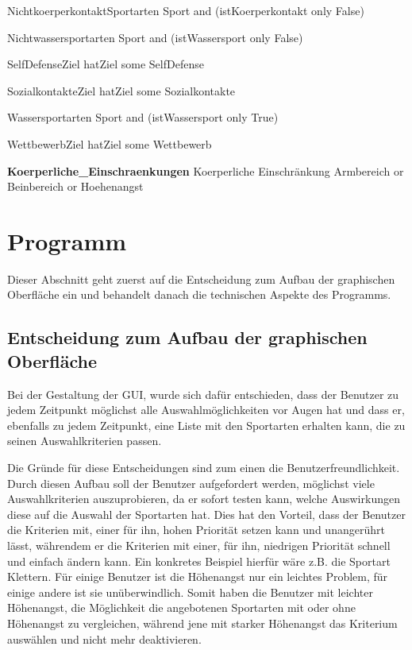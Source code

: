NichtkoerperkontaktSportarten 
	Sport and (istKoerperkontakt only False)
	
Nichtwassersportarten 
	Sport and (istWassersport only False)
	
SelfDefenseZiel 
	hatZiel some SelfDefense
	
SozialkontakteZiel 
	hatZiel some Sozialkontakte
	
Wassersportarten 
	Sport and (istWassersport only True)
	
WettbewerbZiel 
	hatZiel some Wettbewerb
	
\textbf{Koerperliche\_Einschraenkungen}
Koerperliche Einschränkung
Armbereich
 or Beinbereich
 or Hoehenangst



\section{Programm}

Dieser Abschnitt geht zuerst auf die Entscheidung zum Aufbau der graphischen Oberfläche ein und behandelt danach die technischen Aspekte des Programms. 

\subsection{Entscheidung zum Aufbau der graphischen Oberfläche}
Bei der Gestaltung der GUI, wurde sich dafür entschieden, dass der Benutzer zu jedem Zeitpunkt möglichst alle Auswahlmöglichkeiten vor Augen hat und dass er, ebenfalls zu jedem Zeitpunkt, eine Liste mit den Sportarten erhalten kann, die zu seinen Auswahlkriterien passen.

Die Gründe für diese Entscheidungen sind zum einen die Benutzerfreundlichkeit. Durch diesen Aufbau soll der Benutzer aufgefordert werden, möglichst viele Auswahlkriterien auszuprobieren, da er sofort testen kann, welche Auswirkungen diese auf die Auswahl der Sportarten hat. Dies hat den Vorteil, dass der Benutzer die Kriterien mit, einer für ihn, hohen Priorität setzen kann und unangerührt lässt, währendem er die Kriterien mit einer, für ihn, niedrigen Priorität schnell und einfach ändern kann. Ein konkretes Beispiel hierfür wäre z.B. die Sportart Klettern. Für einige Benutzer ist die Höhenangst nur ein leichtes Problem, für einige andere ist sie unüberwindlich. Somit haben die Benutzer mit leichter Höhenangst, die Möglichkeit die angebotenen Sportarten mit oder ohne Höhenangst zu vergleichen, während jene mit starker Höhenangst das Kriterium auswählen und nicht mehr deaktivieren.

